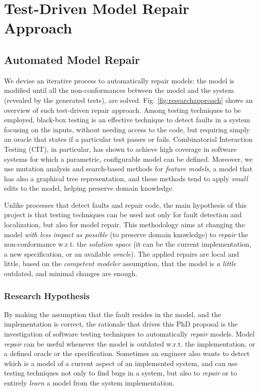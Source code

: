 \part{Test-Driven Model Repair Approach}
\chapter{Automated Model Repair}\label{ch:automatedrepair}
We devise an iterative process to automatically repair models: the model is modified until all the non-conformances between the model and the system (revealed by the generated tests), are solved. Fig. \ref{fig:researchapproach} shows an overview of such test-driven repair approach. 
Among testing techniques to be employed, black-box testing is an effective technique to detect faults in a system focusing on the inputs, without needing access to the code, but requiring simply an oracle that states if a particular test passes or fails. 
Combinatorial Interaction Testing (CIT), in particular, has shown to achieve high coverage in software systems for which a parametric, configurable model can be defined. Moreover, we use mutation analysis and search-based methods for \textit{feature models}, a model that has also a graphical tree representation, and these methods tend to apply \textit{small} edits to the model, helping preserve domain knowledge.

Unlike processes that detect faults and repair code, the main hypothesis of this project is that testing techniques can be used not only for fault detection and localization, but also for model repair.
This methodology aims at changing the model \textit{with less impact as possible} (to preserve domain knowledge) to \textit{repair} the non-conformance w.r.t. the \textit{solution space} (it can be the current implementation, a new specification, or an available \textit{oracle}).
The applied repairs are local and little, based on the \textit{competent modeler} assumption, that the model is \textit{a little} outdated, and minimal changes are enough. 


\section{Research Hypothesis}\label{sec:hypothesis}
By making the assumption that the fault resides in the model, and the implementation is correct, the rationale that drives this PhD proposal is the investigation of software testing techniques to automatically \textit{repair} models.
Model \textit{repair} can be useful whenever the model is outdated w.r.t. the implementation, or a defined oracle or the specification.
Sometimes an engineer also wants to detect which is a model of a current aspect of an implemented system, and can use testing techniques not only to find bugs in a system, but also to \textit{repair} or to entirely \textit{learn} a model from the system implementation.

